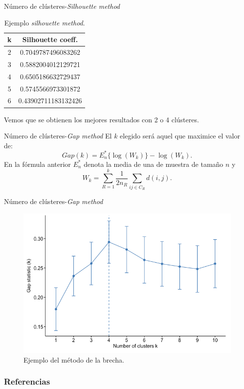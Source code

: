 \documentclass[spanish]{beamer}
\begin{document}
\begin{frame}{Número de clústeres-\textit{Silhouette method}}
	\begin{table}[h!]
		\centering
		\begin{tabular}{cc} 
			\hline
			k & Silhouette coeff. \\
			\hline
			2 &  0.7049787496083262 \\			 
			3 & 0.5882004012129721 \\	
			4 &  0.6505186632729437 \\
			5 &  0.5745566973301872 \\
			6 & 0.43902711183132426 \\
			\hline
		\end{tabular}
		\caption{Ejemplo \textit{silhouette method}.}
	\end{table}
	Vemos que se obtienen los mejores resultados con 2 o 4 clústeres.
\end{frame}

\begin{frame}{Número de clústeres-\textit{Gap method}}
	El $ k $ elegido será aquel que maximice el valor de:
	\[
	Gap(k) = E^*_n\{ \log(W_k)\} - \log(W_k).
	\]
	En la fórmula anterior $ E^*_n $ denota la media de una de muestra de tamaño $ n $ y 
	\[
	W_k = \sum_{R = 1}^{k}\frac{1}{2 n_R}\sum_{i j \in C_R} d(i,j).
	\]
\end{frame}

\begin{frame}{Número de clústeres-\textit{Gap method}}
	\begin{figure}[H]
		\centering
		\includegraphics[scale=0.32]{pedro/gapGraph}
		\caption{Ejemplo del método de la brecha.}
	\end{figure}
\end{frame}

\begin{frame}
  \frametitle{Referencias}
        
        
\end{frame}
\end{document}
